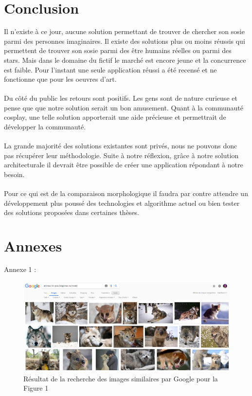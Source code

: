 \documentclass[a4paper,12pt]{article}
\begin{document}
\section*{Conclusion}
Il n'existe à ce jour, aucune solution permettant de trouver de chercher son sosie parmi des personnes imaginaires. Il existe des solutions plus ou moins réussis qui permettent de trouver son sosie parmi des être humains réelles ou parmi des stars. Mais dans le domaine du fictif le marché est encore jeune et la concurrence est faible. Pour l'instant une seule application réussi a été recensé et ne fonctionne que pour les oeuvres d'art. 
\\ \\ 
Du côté du public les retours sont positifs. Les gens sont de nature curieuse et pense que que notre solution serait un bon amusement. Quant à la communauté cosplay, une telle solution apporterait une aide précieuse et permettrait de développer la communauté. 
\\ \\
La grande majorité des solutions existantes sont privés, nous ne pouvons donc pas récupérer leur méthodologie. Suite à notre réflexion, grâce à notre solution architecturale il devrait être possible de créer une application répondant à notre besoin. 
\\ \\ 
Pour ce qui est de la comparaison morphologique il faudra par contre attendre un développement plus poussé des technologies et algorithme actuel ou bien tester des solutions proposées dans certaines thèses. 
\newpage



\section{Annexes}
Annexe 1 : 
\begin{figure}[!ht]
    \centering
    \includegraphics[scale=0.8]{images/Res2GI.PNG}
    \caption{Résultat de la recherche des images similaires par Google pour la Figure 1}
\end{figure}
\end{document}
